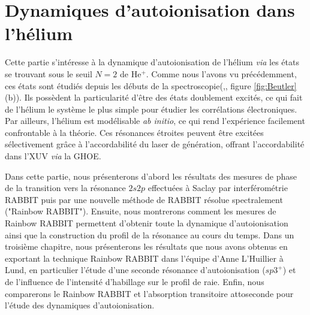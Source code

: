\part{Dynamiques d'autoionisation dans l'hélium}
Cette partie s'intéresse à la dynamique d'autoionisation de l'hélium \textit{via} les états se trouvant sous le seuil $N=2$ de He$^+$. Comme nous l'avons vu précédemment, ces états sont étudiés depuis les débuts de la spectroscopie(,, figure \ref{fig:Beutler}(b)). Ils possèdent la particularité d'être des états doublement excités, ce qui fait de l'hélium le système le plus simple pour étudier les corrélations électroniques. Par ailleurs, l'hélium est modélisable \textit{ab initio}, ce qui rend l'expérience facilement confrontable à la théorie. Ces résonances étroites peuvent être excitées sélectivement grâce à l'accordabilité du laser de génération, offrant l'accordabilité dans l'XUV \textit{via} la GHOE.

Dans cette partie, nous présenterons d'abord les résultats des mesures de phase de la transition vers la résonance $2s2p$ effectuées à Saclay par interférométrie RABBIT puis par une nouvelle méthode de RABBIT résolue spectralement ("Rainbow RABBIT"). Ensuite, nous montrerons comment les mesures de Rainbow RABBIT permettent d'obtenir toute la dynamique d'autoionisation ainsi que la construction du profil de la résonance au cours du temps. Dans un troisième chapitre, nous présenterons les résultats que nous avons obtenus en exportant la technique Rainbow RABBIT dans l'équipe d'Anne L'Huillier à Lund, en particulier l'étude d'une seconde résonance d'autoionisation ($sp3^+$) et de l'influence de l'intensité d'habillage sur le profil de raie. Enfin, nous comparerons le Rainbow RABBIT et l'absorption transitoire attoseconde pour l'étude des dynamiques d'autoionisation.

